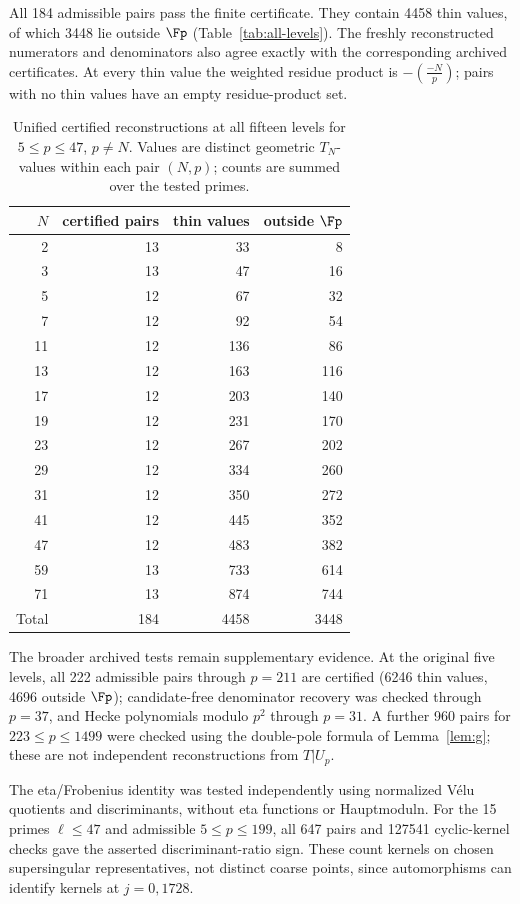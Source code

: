 All 184 admissible pairs pass the finite certificate. They contain
4458 thin values, of which 3448 lie outside $\Fp$
(Table~\ref{tab:all-levels}). The freshly reconstructed numerators and
denominators also agree exactly with the corresponding archived certificates.
At every thin value the weighted residue product is
$-\left(\frac{-N}{p}\right)$; pairs with no thin values have an empty
residue-product set.

\begin{table}[htbp]\centering\small
\begin{tabular}{rrrr}\toprule
$N$ & certified pairs & thin values & outside $\Fp$\\\midrule
2&13&33&8\\
3&13&47&16\\
5&12&67&32\\
7&12&92&54\\
11&12&136&86\\
13&12&163&116\\
17&12&203&140\\
19&12&231&170\\
23&12&267&202\\
29&12&334&260\\
31&12&350&272\\
41&12&445&352\\
47&12&483&382\\
59&13&733&614\\
71&13&874&744\\
\midrule
Total&184&4458&3448\\\bottomrule
\end{tabular}
\caption{Unified certified reconstructions at all fifteen levels for
$5\le p\le47$, $p\ne N$. Values are distinct geometric $T_N$-values
within each pair $(N,p)$; counts are summed over the tested primes.}
\label{tab:all-levels}\label{tab:n0-levels}\label{tab:new-levels}
\end{table}

The broader archived tests remain supplementary evidence. At the original
five levels, all 222 admissible pairs through $p=211$ are certified
(6246 thin values, 4696 outside $\Fp$); candidate-free denominator recovery
was checked through $p=37$, and Hecke polynomials modulo $p^2$ through
$p=31$. A further 960 pairs for $223\le p\le1499$ were checked using the
double-pole formula of Lemma~\ref{lem:g}; these are not independent
reconstructions from $T|U_p$.

The eta/Frobenius identity was tested independently using normalized
V\'elu quotients and discriminants, without eta functions or Hauptmoduln.
For the 15 primes $\ell\le47$ and admissible $5\le p\le199$, all 647 pairs
and 127541 cyclic-kernel checks gave the asserted discriminant-ratio sign.
These count kernels on chosen supersingular representatives, not distinct
coarse points, since automorphisms can identify kernels at $j=0,1728$.

